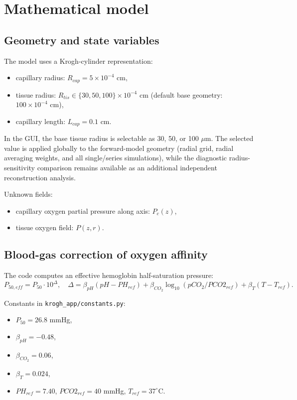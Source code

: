 \documentclass[12pt,a4paper]{article}
\begin{document}
\section{Mathematical model}
\subsection{Geometry and state variables}
The model uses a Krogh-cylinder representation:
\begin{itemize}
    \item capillary radius: $R_{cap}=5\times10^{-4}$ cm,
    \item tissue radius: $R_{tis}\in\{30,50,100\}\times10^{-4}$ cm (default base geometry: $100\times10^{-4}$ cm),
    \item capillary length: $L_{cap}=0.1$ cm.
\end{itemize}

In the GUI, the base tissue radius is selectable as 30, 50, or 100 $\mu$m. The selected value is applied globally to the forward-model geometry (radial grid, radial averaging weights, and all single/series simulations), while the diagnostic radius-sensitivity comparison remains available as an additional independent reconstruction analysis.

Unknown fields:
\begin{itemize}
    \item capillary oxygen partial pressure along axis: $P_c(z)$,
    \item tissue oxygen field: $P(z,r)$.
\end{itemize}

\subsection{Blood-gas correction of oxygen affinity}
The code computes an effective hemoglobin half-saturation pressure:
\[
P_{50,eff} = P_{50}\cdot10^{\Delta},
\quad
\Delta = \beta_{pH}(pH-PH_{ref}) + \beta_{CO_2}\log_{10}(pCO_2/PCO2_{ref}) + \beta_T(T-T_{ref}).
\]

Constants in \texttt{krogh\_app/constants.py}:
\begin{itemize}
    \item $P_{50}=26.8$ mmHg,
    \item $\beta_{pH}=-0.48$,
    \item $\beta_{CO_2}=0.06$,
    \item $\beta_T=0.024$,
    \item $PH_{ref}=7.40$, $PCO2_{ref}=40$ mmHg, $T_{ref}=37^\circ$C.
\end{itemize}
\end{document}
